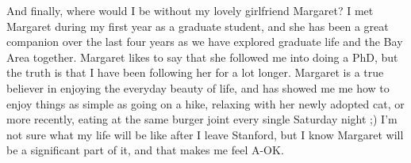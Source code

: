 And finally, where would I be without my lovely girlfriend Margaret? I met Margaret during my first year as a graduate student, and she has been a 
great companion over the last four years as we have explored graduate life and the Bay Area together. Margaret likes to say that she followed me into
doing a PhD, but the truth is that I have been following her for a lot longer. Margaret is a true believer in enjoying the everyday beauty of life, 
and has showed me me how to enjoy things as simple as going on a hike, relaxing with her newly adopted cat, or more recently, eating at the same burger joint
every single Saturday night ;) I'm not sure what my life will be like after I leave Stanford, but I know Margaret will be a significant part of it, and that
makes me feel A-OK.